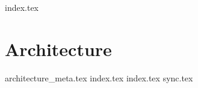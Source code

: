 {index.tex}
\chapter{Architecture}\label{cha:architecture}
{architecture_meta.tex}
{index.tex}
{index.tex}
{sync.tex}
